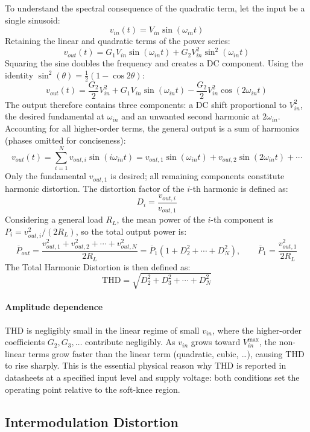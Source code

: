 To understand the spectral consequence of the quadratic term, let the input be a single sinusoid:
\[
v_{in}(t) = V_{in}\sin(\omega_{in} t)
\]
Retaining the linear and quadratic terms of the power series:
\[
v_{out}(t) = G_1 V_{in}\sin(\omega_{in} t) + G_2 V_{in}^{2}\sin^{2}(\omega_{in} t)
\]
Squaring the sine doubles the frequency and creates a DC component. Using the identity \( \sin^2(\theta) = \tfrac{1}{2}(1 - \cos 2\theta) \):
\[
v_{out}(t) = \frac{G_2}{2}V_{in}^2
             + G_1 V_{in}\sin(\omega_{in} t)
             - \frac{G_2}{2}V_{in}^2\cos(2\omega_{in} t)
\]
The output therefore contains three components: a DC shift proportional to \( V_{in}^2 \), the desired fundamental at \( \omega_{in} \) and an unwanted second harmonic at \( 2\omega_{in} \). Accounting for all higher-order terms, the general output is a sum of harmonics (phases omitted for conciseness):
\[
v_{out}(t) = \sum_{i=1}^{N} v_{out,i}\sin(i \omega_{in} t)
= v_{out,1}\sin(\omega_{in} t) + v_{out,2}\sin(2\omega_{in} t) + \cdots
\]
Only the fundamental \( v_{out,1} \) is desired; all remaining components constitute harmonic distortion. The distortion factor of the \( i \)-th harmonic is defined as:
\[
D_i = \frac{v_{out,i}}{v_{out,1}}
\]
Considering a general load \( R_L \), the mean power of the \( i \)-th component is
\( P_i = v_{out,i}^2 / (2R_L) \), so the total output power is:
\[
\overline{P}_{out} = \frac{v_{out,1}^2 + v_{out,2}^2 + \cdots + v_{out,N}^2}{2R_L}
= \overline{P}_1 \left(1 + D_2^2 + \cdots + D_N^2\right),
\qquad \overline{P}_1 = \frac{v_{out,1}^2}{2R_L}
\]
The Total Harmonic Distortion is then defined as:
\[
\mathrm{THD} = \sqrt{D_2^2 + D_3^2 + \cdots + D_N^2}
\]

\paragraph{Amplitude dependence} THD is negligibly small in the linear regime of small \( v_{in} \), where the higher-order coefficients \( G_2, G_3, \ldots \) contribute negligibly. As \( v_{in} \) grows toward \( V_{in}^{\max} \), the non-linear terms grow faster than the linear term (quadratic, cubic, \ldots), causing THD to rise sharply. This is the essential physical reason why THD is reported in datasheets at a specified input level and supply voltage: both conditions set the operating point relative to the soft-knee region.

\subsection{Intermodulation Distortion}

